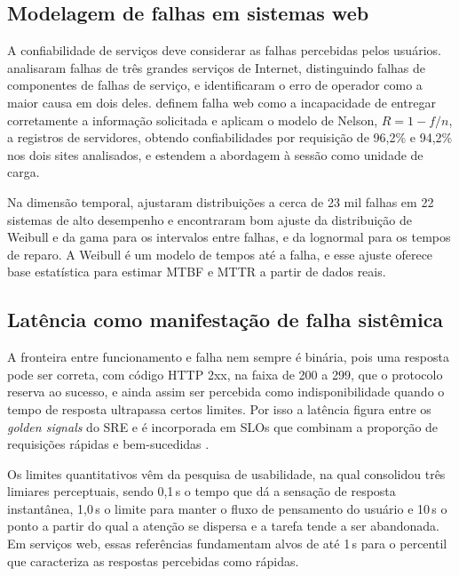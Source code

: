 \documentclass[12pt, a4paper, oneside]{article}
\begin{document}
\subsection{Modelagem de falhas em sistemas web}

A confiabilidade de serviços deve considerar as falhas percebidas pelos usuários.  analisaram falhas de três grandes serviços de Internet, distinguindo falhas de componentes de falhas de serviço, e identificaram o erro de operador como a maior causa em dois deles.  definem falha web como a incapacidade de entregar corretamente a informação solicitada e aplicam o modelo de Nelson, $R = 1 - f/n$, a registros de servidores, obtendo confiabilidades por requisição de 96,2\% e 94,2\% nos dois sites analisados, e  estendem a abordagem à sessão como unidade de carga.

Na dimensão temporal,  ajustaram distribuições a cerca de 23 mil falhas em 22 sistemas de alto desempenho e encontraram bom ajuste da distribuição de Weibull e da gama para os intervalos entre falhas, e da lognormal para os tempos de reparo. A Weibull é um modelo de tempos até a falha, e esse ajuste oferece base estatística para estimar MTBF e MTTR a partir de dados reais.

\subsection{Latência como manifestação de falha sistêmica}

A fronteira entre funcionamento e falha nem sempre é binária, pois uma resposta pode ser correta, com código HTTP 2xx, na faixa de 200 a 299, que o protocolo reserva ao sucesso, e ainda assim ser percebida como indisponibilidade quando o tempo de resposta ultrapassa certos limites. Por isso a latência figura entre os \textit{golden signals} do SRE \cite{beyer2016sre} e é incorporada em SLOs que combinam a proporção de requisições rápidas e bem-sucedidas \cite{jones2016slo}.

Os limites quantitativos vêm da pesquisa de usabilidade, na qual  consolidou três limiares perceptuais, sendo 0,1\,s o tempo que dá a sensação de resposta instantânea, 1,0\,s o limite para manter o fluxo de pensamento do usuário e 10\,s o ponto a partir do qual a atenção se dispersa e a tarefa tende a ser abandonada. Em serviços web, essas referências fundamentam alvos de até 1\,s para o percentil que caracteriza as respostas percebidas como rápidas.
\end{document}
